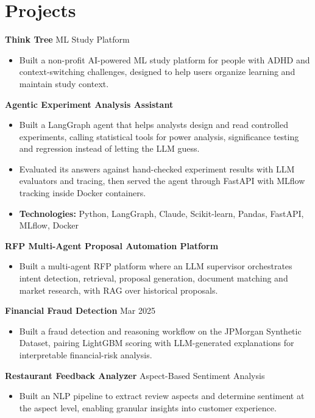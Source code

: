 \documentclass[10pt,a4paper]{article}
\begin{document}
\section{Projects}
\textbf{Think Tree} \textbar{} ML Study Platform\par
\begin{itemize}
  \item Built a non-profit AI-powered ML study platform for people with ADHD and context-switching challenges, designed to help users organize learning and maintain study context.
\end{itemize}
\textbf{Agentic Experiment Analysis Assistant}\par
\begin{itemize}
  \item Built a LangGraph agent that helps analysts design and read controlled experiments, calling statistical tools for power analysis, significance testing and regression instead of letting the LLM guess.
  \item Evaluated its answers against hand-checked experiment results with LLM evaluators and tracing, then served the agent through FastAPI with MLflow tracking inside Docker containers.
  \item \textbf{Technologies:} Python, LangGraph, Claude, Scikit-learn, Pandas, FastAPI, MLflow, Docker
\end{itemize}
\textbf{RFP Multi-Agent Proposal Automation Platform}\par
\begin{itemize}
  \item Built a multi-agent RFP platform where an LLM supervisor orchestrates intent detection, retrieval, proposal generation, document matching and market research, with RAG over historical proposals.
\end{itemize}
\textbf{Financial Fraud Detection} \textbar{} Mar 2025\par
\begin{itemize}
  \item Built a fraud detection and reasoning workflow on the JPMorgan Synthetic Dataset, pairing LightGBM scoring with LLM-generated explanations for interpretable financial-risk analysis.
\end{itemize}
\textbf{Restaurant Feedback Analyzer} \textbar{} Aspect-Based Sentiment Analysis\par
\begin{itemize}
  \item Built an NLP pipeline to extract review aspects and determine sentiment at the aspect level, enabling granular insights into customer experience.
\end{itemize}
\end{document}
